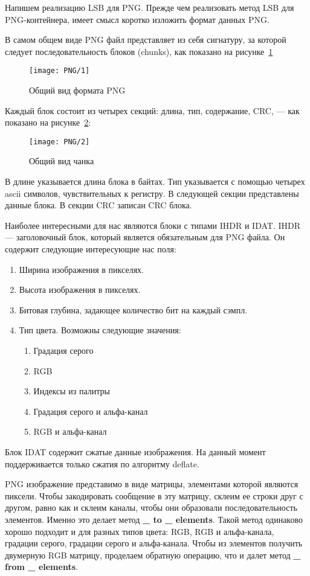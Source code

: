 Напишем реализацию LSB для PNG. Прежде чем реализовать метод LSB для PNG-контейнера,
имеет смысл коротко изложить формат данных PNG.

В самом общем виде PNG файл представляет из себя сигнатуру,
за которой следует последовательность блоков (chunks),
как показано на рисунке~\ref{img:png_1}
\begin{figure}[ht!]
    \caption{Общий вид формата PNG}
    \texttt{[image: PNG/1]}
    \centering
    \label{img:png_1}
\end{figure}

Каждый блок состоит из четырех секций: длина, тип, содержание, CRC, --- как показано на рисунке~\ref{img:png_2}:
\begin{figure}[ht!]
    \caption{Общий вид чанка}
    \texttt{[image: PNG/2]}
    \centering
    \label{img:png_2}
\end{figure}
В длине указывается длина блока в байтах. Тип указывается с помощью четырех ascii символов,
чувствительных к регистру. В следующей секции представлены данные блока.
В секции CRC записан CRC блока.

Наиболее интересными для нас являются блоки с типами IHDR и IDAT.
IHDR --- заголовочный блок, который является обязательным для PNG файла.
Он содержит следующие интересующие нас поля:
\begin{enumerate}
    \item Ширина изображения в пикселях.
    \item Высота изображения в пикселях.
    \item Битовая глубина, задающее количество бит на каждый сэмпл.
    \item Тип цвета. Возможны следующие значения:
    \begin{enumerate}
        \item Градация серого
        \item RGB
        \item Индексы из палитры
        \item Градация серого и альфа-канал
        \item RGB и альфа-канал
    \end{enumerate}
\end{enumerate}

Блок IDAT содержит сжатые данные изображения.
На данный момент поддерживается только сжатия по алгоритму deflate.

PNG изображение представимо в виде матрицы, элементами которой являются пиксели.
Чтобы закодировать сообщение в эту матрицу, склеим ее строки друг с другом,
равно как и склеим каналы, чтобы они образовали последовательность элементов.
Именно это делает метод \textbf{\_ to \_ elements}.
Такой метод одинаково хорошо подходит и для разных типов цвета: RGB, RGB и альфа-канала,
градации серого, градации серого и альфа-канала.
Чтобы из элементов получить двумерную RGB матрицу,
проделаем обратную операцию, что и далет метод \textbf{\_ from \_ elements}.

